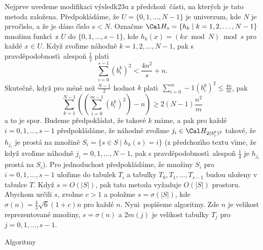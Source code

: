 \documentclass[a4paper,12pt]{article}
\begin{document}
\flushpar Nejprve uvedeme modifikaci v\'ysledk\accent23u z 
p\v redchoz\'\i\ \v c\'asti, na kter\'ych je tato metoda zalo\v zena.
P\v redpokl\'ad\'ame, \v ze $U=\{0,1,\dots,N-1\}$ je univerzum, kde $
N$ je 
prvo\v c\'\i slo, a \v ze je d\'ano \v c\'\i slo $s<N$. Ozna\v cme 
$\Cal H_s=\{h_k\mid k=1,2,\dots,N-1\}$ mno\v zinu funkc\'\i\ z $U$ do 
$\{0,1,\dots,s-1\}$, kde $h_k(x)=(kx\bmod N)\bmod s$ pro ka\v zd\'e $
x\in U$. 
Kdy\v z zvol\'\i me n\'ahodn\v e $k=1,2,\dots,N-1$, pak s pravd\v epodobnost\'\i\ 
ales\-po\v n $\frac 12$ plat\'\i\ 
$$\sum_{i=0}^{s-1}(b_i^k)^2<\frac {4n^2}s+n.$$
Skute\v cn\v e, kdy\v z pro m\'en\v e ne\v z $\frac{N-1}2$ hodnot $k$ plat\'\i\ $\sum_{i=0}^m-1(b^k_i)^2\le\frac{4n}m$, pak 
$$\sum_{k=1}^{N-1}\left((\sum_{i=0}^{m-1}(b^k_i)^2)-n\right)\ge2(N-1)\frac{n^2}m$$ 
a to je spor. Budeme p\v redpokl\'adat, 
\v ze takov\'e $k$ m\'ame, a pak pro ka\v zd\'e $i=0,1,\dots,s-1$ 
p\v redpokl\'ad\'ame, \v ze n\'ahodn\v e zvol\'\i me $j_i\in \Cal H_{
2(b_i^k)^2}$ takov\'e, \v ze 
$h_{j_i}$ je prost\'a na mno\v zin\v e $S_i=\{s\in S\mid h_k(s)=i
\}$ (z p\v redchoz\'\i ho textu v\'\i me, \v ze kdy\v z zvol\'\i me n\'ahodn\v e 
$j_i=0,1,\dots,N-1$, pak s pravd\v epodobnost\'\i\ ales\-po\v n $\frac 
14$ je $h_{j_i}$ prost\'a na $S_i$). Pro jednoduchost p\v redpokl\'ad\'ame, \v ze mno\v ziny $
S_i$ 
pro $i=0,1,\dots,s-1$ ulo\v z\'\i me do tabulek $T_i$ a tabulky 
$T_0,T_1,\dots,T_{s-1}$ budou ulo\v zeny v tabulce $T$. Kdy\v z $
s=O(|S|)$, 
pak tato metoda vy\v zaduje $O(|S|)$ prostoru. Abychom ur\v cili $
s$, 
zvolme $c>1$ a polo\v zme $s=\sigma (|S|)$, kde $\sigma (n)=\frac 
43\sqrt 6(1+c)n$ pro 
ka\v zd\'e $n$. Nyn\'\i\ pop\'\i\v seme algoritmy. Zde $n$ je velikost reprezentovan\'e mno\v ziny, $s=\sigma(n)$ a $2m(j)$ je velikost tabulky $T_j$ pro $j=0,1,\dots,s-1$.
\medskip

\subhead
Algoritmy
\endsubhead
\bigskip
\end{document}

